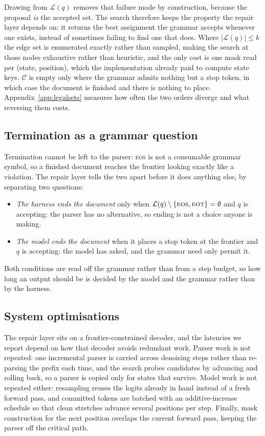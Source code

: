 \documentclass{article}
\begin{document}
Drawing from $\mathcal{L}(q)$ removes that failure mode by construction, because
the proposal \emph{is} the accepted set. The search therefore keeps the property
the repair layer depends on: it returns the best assignment the grammar accepts
whenever one exists, instead of sometimes failing to find one that does. Where
$|\mathcal{L}(q)|\le k$ the edge set is enumerated exactly rather than sampled,
making the search at those nodes exhaustive rather than heuristic, and the only
cost is one mask read per (state, position), which the implementation already
paid to compute state keys. $\mathcal{C}$ is empty only where the grammar admits
nothing but a stop token, in which case the document is finished and there is
nothing to place. Appendix~\ref{app:legalsets} measures how often the two orders
diverge and what reversing them costs.

\subsection{Termination as a grammar question}
\label{sec:stop}

Termination cannot be left to the parser: \textsc{eos} is not a consumable
grammar symbol, so a finished document reaches the frontier looking exactly like
a violation. The repair layer tells the two apart before it does anything else,
by separating two questions:
\begin{itemize}[leftmargin=1.4em,itemsep=1pt,topsep=2pt]
\item \emph{The harness ends the document} only when
      $\mathcal{L}(q)\setminus\{\textsc{eos},\textsc{eot}\}=\emptyset$ and $q$ is
      accepting: the parser has no alternative, so ending is not a choice anyone
      is making.
\item \emph{The model ends the document} when it places a stop token at the
      frontier and $q$ is accepting: the model has asked, and the grammar need
      only permit it.
\end{itemize}
Both conditions are read off the grammar rather than from a step budget, so how
long an output should be is decided by the model and the grammar rather than by
the harness.

\subsection{System optimisations}
The repair layer sits on a frontier-constrained decoder, and the latencies we
report depend on how that decoder avoids redundant work. Parser work is not
repeated: one incremental parser is
carried across denoising steps rather than re-parsing the prefix each time, and
the search probes candidates by advancing and rolling back, so a parser is
copied only for states that survive. Model work is not repeated either:
resampling reuses the logits already in hand instead of a fresh forward pass,
and committed tokens are batched with an additive-increase schedule so that
clean stretches advance several positions per step. Finally, mask construction
for the next position overlaps the current forward pass, keeping the parser off
the critical path.
\end{document}
